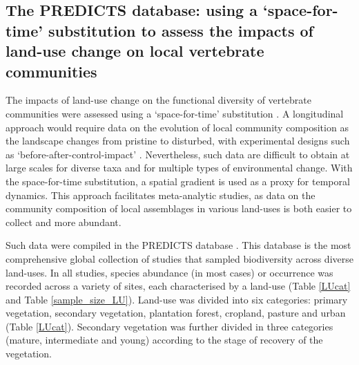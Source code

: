 \subsection{The PREDICTS database: using a `space-for-time' substitution to assess the impacts of land-use change on local vertebrate communities}
The impacts of land-use change on the functional diversity of vertebrate communities were assessed using a `space-for-time' substitution \citep{depalma2018}. A longitudinal approach would require data on the evolution of local community composition as the landscape changes from pristine to disturbed, with experimental designs such as `before-after-control-impact' \citep{depalma2018}. Nevertheless, such data are difficult to obtain at large scales for diverse taxa and for multiple types of environmental change. With the space-for-time substitution, a spatial gradient is used as a proxy for temporal dynamics. This approach facilitates meta-analytic studies, as data on the community composition of local assemblages in various land-uses is both easier to collect and more abundant. 

Such data were compiled in the PREDICTS database \citep{Hudson2014, Hudson2017}. This database is the most comprehensive global collection of studies that sampled biodiversity across diverse land-uses. In all studies, species abundance (in most cases) or occurrence was recorded across a variety of sites, each characterised by a land-use (Table \ref{LUcat} and Table \ref{sample_size_LU}). Land-use was divided into six categories: primary vegetation, secondary vegetation, plantation forest, cropland, pasture and urban (Table \ref{LUcat}). Secondary vegetation was further divided in three categories (mature, intermediate and young) according to the stage of recovery of the vegetation. 

